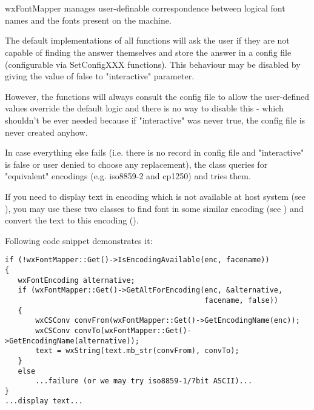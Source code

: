 %
%

\section{}\label{wxfontmapper}

wxFontMapper manages user-definable correspondence between logical font
names and the fonts present on the machine.

The default implementations of all functions will ask the user if they are
not capable of finding the answer themselves and store the answer in a
config file (configurable via SetConfigXXX functions). This behaviour may
be disabled by giving the value of false to "interactive" parameter.

However, the functions will always consult the config file to allow the
user-defined values override the default logic and there is no way to
disable this - which shouldn't be ever needed because if "interactive" was
never true, the config file is never created anyhow.

In case everything else fails (i.e. there is no record in config file
and "interactive" is false or user denied to choose any replacement), 
the class queries  
for "equivalent" encodings (e.g. iso8859-2 and cp1250) and tries them.


If you need to display text in encoding which is not available at
host system (see ),
you may use these two classes to find font in some similar encoding
(see )
and convert the text to this encoding 
().

Following code snippet demonstrates it:

\begin{verbatim}
if (!wxFontMapper::Get()->IsEncodingAvailable(enc, facename))
{
   wxFontEncoding alternative;
   if (wxFontMapper::Get()->GetAltForEncoding(enc, &alternative,
                                              facename, false))
   {
       wxCSConv convFrom(wxFontMapper::Get()->GetEncodingName(enc));
       wxCSConv convTo(wxFontMapper::Get()->GetEncodingName(alternative));
       text = wxString(text.mb_str(convFrom), convTo);
   }
   else
       ...failure (or we may try iso8859-1/7bit ASCII)...
}
...display text...
\end{verbatim}


